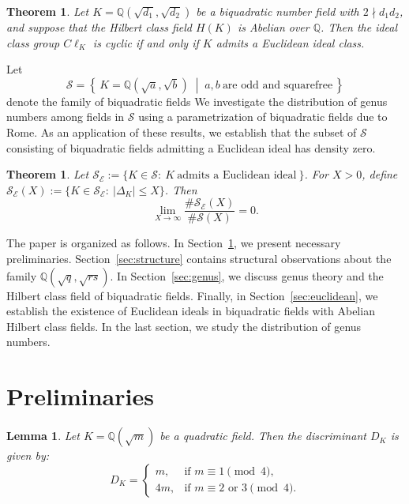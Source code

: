 \documentclass[12 pt]{amsart}
\newtheorem{theorem}[thm]{Theorem}
\newtheorem{lemma}[thm]{Lemma}
\theoremstyle{definition}
\theoremstyle{remark}
\begin{document}
\begin{theorem}
Let $K = \mathbb{Q}(\sqrt{d_1}, \sqrt{d_2})$ be a biquadratic number field with $2 \nmid d_1 d_2$, and suppose that the Hilbert class field $H(K)$ is Abelian over $\mathbb{Q}$. Then the ideal class group $C\ell_K$ is cyclic if and only if $K$ admits a Euclidean ideal class.
\end{theorem}

Let  
\[
\mathcal{S} = \left\{\, K = \mathbb{Q}(\sqrt{a}, \sqrt{b}) \;\middle|\; a,b \ \text{are odd and squarefree} \,\right\}
\]
denote the family of biquadratic fields 
We investigate the distribution of genus numbers among fields in $ \mathcal{S} $ using a parametrization of biquadratic fields due to Rome\cite{Rom18}.  
As an application of these results, we establish that the subset of $ \mathcal{S} $ consisting of biquadratic fields admitting a Euclidean ideal has density zero.

\begin{theorem}\label{density_Euclidean}
Let 
$\mathcal S_{\mathcal E}:=\{K\in\mathcal S:\ K\ \text{admits a Euclidean ideal} \ \}$.
	For $X>0$, define  $\mathcal S_{\mathcal E}(X):=\{K\in\mathcal S_{\mathcal E}:\ |\Delta_K|\le X\}$. Then 
	\[
	\lim_{X\to\infty}\frac{\#\mathcal S_{\mathcal E}(X)}{\#\mathcal S(X)}=0.
	\]
\end{theorem}

The paper is organized as follows. In Section~\ref{sec:prelim}, we present necessary preliminaries. Section~\ref{sec:structure} contains structural observations about the family $\mathbb{Q}(\sqrt{q}, \sqrt{rs})$. In Section~\ref{sec:genus}, we discuss genus theory and the Hilbert class field of biquadratic fields. Finally, in Section~\ref{sec:euclidean}, we establish the existence of Euclidean ideals in biquadratic fields with Abelian Hilbert class fields. In the last section, we study the distribution of genus numbers.

 
	\section{Preliminaries}\label{sec:prelim}
	\begin{lemma}
Let $K = \mathbb{Q}(\sqrt{m})$ be a quadratic field. Then the discriminant $D_K$ is given by:
\[
D_K = 
\begin{cases} 
m, & \text{if } m \equiv 1 \pmod{4}, \\
4m, & \text{if } m \equiv 2 \text{ or } 3 \pmod{4}.
\end{cases}
\]
\end{lemma}
\end{document}
